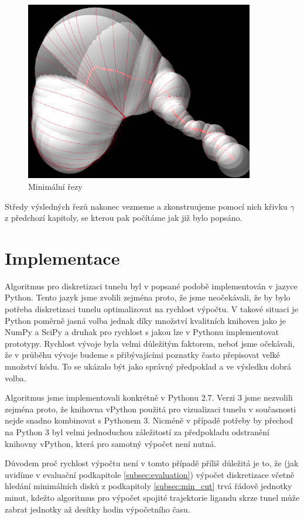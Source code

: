 \begin{figure}[ht]
    \centering
    \includegraphics[width=100mm]{img/min_cuts.png}
    \caption{Minimální řezy}
  \centering
  \label{fig:min_cuts}
\end{figure}

Středy výsledných řezů nakonec vezmeme a zkonstruujeme pomocí nich křivku
$ \gamma $ z předchozí kapitoly, se kterou pak počítáme jak již bylo popsáno.

\section{Implementace} \label{subsec:implementation}
Algoritmus pro diskretizaci tunelu byl v popsané podobě implementován v
jazyce Python. Tento jazyk jsme zvolili zejména proto, že jsme neočekávali, že
by bylo potřeba diskretizaci tunelu optimalizovat na rychlost výpočtu. V takové
situaci je Python poměrně jasná volba jednak díky množství kvalitních
knihoven jako je NumPy a SciPy a druhak pro rychlost s jakou lze v Pythonu
implementovat prototypy. Rychlost vývoje byla velmi důležitým faktorem, neboť
jsme očekávali, že v průběhu vývoje budeme s přibývajícími poznatky často
přepisovat velké množství kódu. To se ukázalo být jako správný předpoklad
a ve výsledku dobrá volba.

Algoritmus jsme implementovali konkrétně v Pythonu 2.7. Verzi 3 jsme nezvolili
zejména proto, že knihovna vPython použitá pro vizualizaci tunelu v současnosti
nejde snadno kombinovat s Pythonem 3. Nicméně v případě potřeby by přechod na
Python 3 byl velmi jednoduchou záležitostí za předpokladu odstranění knihovny
vPython, která pro samotný výpočet není nutná.

Důvodem proč rychlost výpočtu není v tomto případě příliš důležitá je to, že
(jak uvidíme v evaluační podkapitole \ref{subsec:evaluation}) výpočet diskretizace
včetně hledání minimálních disků z podkapitoly \ref{subsec:min_cut} trvá řádově
jednotky minut, kdežto algoritmus pro výpočet spojité trajektorie ligandu skrze
tunel může zabrat jednotky až desítky hodin výpočetního času.

